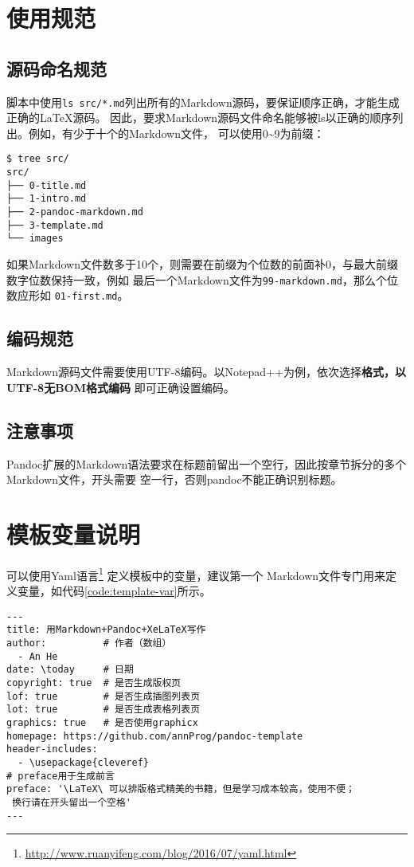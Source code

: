 \documentclass[fancyhdr,bookmark]{ctexbook}
\renewcommand{\href}[2]{#2\footnote{\url{#1}}}
\begin{document}
\section{使用规范}\label{ux4f7fux7528ux89c4ux8303}

\subsection{源码命名规范}\label{ux6e90ux7801ux547dux540dux89c4ux8303}

脚本中使用\lstinline!ls src/*.md!列出所有的Markdown源码，要保证顺序正确，才能生成正确的LaTeX源码。
因此，要求Markdown源码文件命名能够被ls以正确的顺序列出。例如，有少于十个的Markdown文件，
可以使用0\textasciitilde{}9为前缀：

\begin{lstlisting}
$ tree src/
src/
├── 0-title.md
├── 1-intro.md
├── 2-pandoc-markdown.md
├── 3-template.md
└── images
\end{lstlisting}

如果Markdown文件数多于10个，则需要在前缀为个位数的前面补0，与最大前缀数字位数保持一致，例如
最后一个Markdown文件为\lstinline!99-markdown.md!，那么个位数应形如
\lstinline!01-first.md!。

\subsection{编码规范}\label{ux7f16ux7801ux89c4ux8303}

Markdown源码文件需要使用UTF-8编码。以Notepad++为例，依次选择\textbf{格式，以UTF-8无BOM格式编码}
即可正确设置编码。

\subsection{注意事项}\label{title:note}

Pandoc扩展的Markdown语法要求在标题前留出一个空行，因此按章节拆分的多个Markdown文件，开头需要
空一行，否则pandoc不能正确识别标题。

\section{模板变量说明}\label{ux6a21ux677fux53d8ux91cfux8bf4ux660e}

可以使用\href{http://www.ruanyifeng.com/blog/2016/07/yaml.html}{Yaml语言}
定义模板中的变量，建议第一个
Markdown文件专门用来定义变量，如代码\ref{code:template-var}所示。

\begin{lstlisting}[label=code:template-var, caption=code:template-var, float=htbp]
---
title: 用Markdown+Pandoc+XeLaTeX写作
author:          # 作者（数组）
  - An He
date: \today     # 日期
copyright: true  # 是否生成版权页
lof: true        # 是否生成插图列表页
lot: true        # 是否生成表格列表页
graphics: true   # 是否使用graphicx
homepage: https://github.com/annProg/pandoc-template
header-includes:
  - \usepackage{cleveref}
# preface用于生成前言
preface: '\LaTeX\ 可以排版格式精美的书籍，但是学习成本较高，使用不便；
 换行请在开头留出一个空格'
---
\end{lstlisting}
\end{document}
